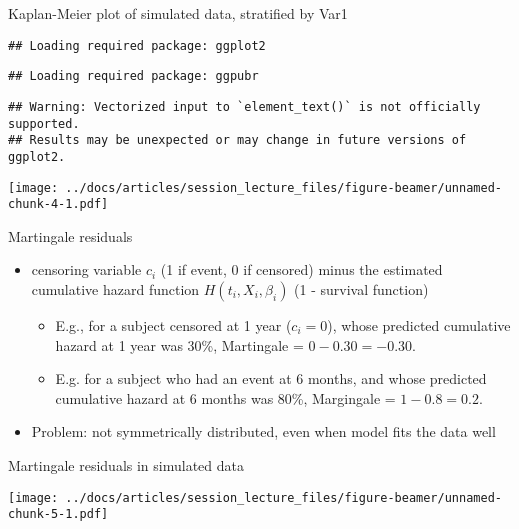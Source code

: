\documentclass[
  ignorenonframetext,
]{beamer}
\providecommand{\tightlist}{%
  \setlength{\itemsep}{0pt}\setlength{\parskip}{0pt}}
\begin{document}
\begin{frame}[fragile]{Kaplan-Meier plot of simulated data, stratified
by Var1}
\protect\hypertarget{kaplan-meier-plot-of-simulated-data-stratified-by-var1}{}

\begin{verbatim}
## Loading required package: ggplot2
\end{verbatim}

\begin{verbatim}
## Loading required package: ggpubr
\end{verbatim}

\begin{verbatim}
## Warning: Vectorized input to `element_text()` is not officially supported.
## Results may be unexpected or may change in future versions of ggplot2.
\end{verbatim}

\texttt{[image: ../docs/articles/session\_lecture\_files/figure-beamer/unnamed-chunk-4-1.pdf]}

\end{frame}

\begin{frame}{Martingale residuals}
\protect\hypertarget{martingale-residuals}{}

\begin{itemize}
\tightlist
\item
  censoring variable \(c_i\) (1 if event, 0 if censored) minus the
  estimated cumulative hazard function \(H(t_i, X_i, \beta_i)\) (1 -
  survival function)

  \begin{itemize}
  \tightlist
  \item
    E.g., for a subject censored at 1 year (\(c_i=0\)), whose predicted
    cumulative hazard at 1 year was 30\%, Martingale =
    \(0 - 0.30 = -0.30\).
  \item
    E.g. for a subject who had an event at 6 months, and whose predicted
    cumulative hazard at 6 months was 80\%, Margingale =
    \(1 - 0.8 = 0.2\).
  \end{itemize}
\item
  Problem: not symmetrically distributed, even when model fits the data
  well
\end{itemize}

\end{frame}

\begin{frame}{Martingale residuals in simulated data}
\protect\hypertarget{martingale-residuals-in-simulated-data}{}

\texttt{[image: ../docs/articles/session\_lecture\_files/figure-beamer/unnamed-chunk-5-1.pdf]}

\end{frame}
\end{document}
